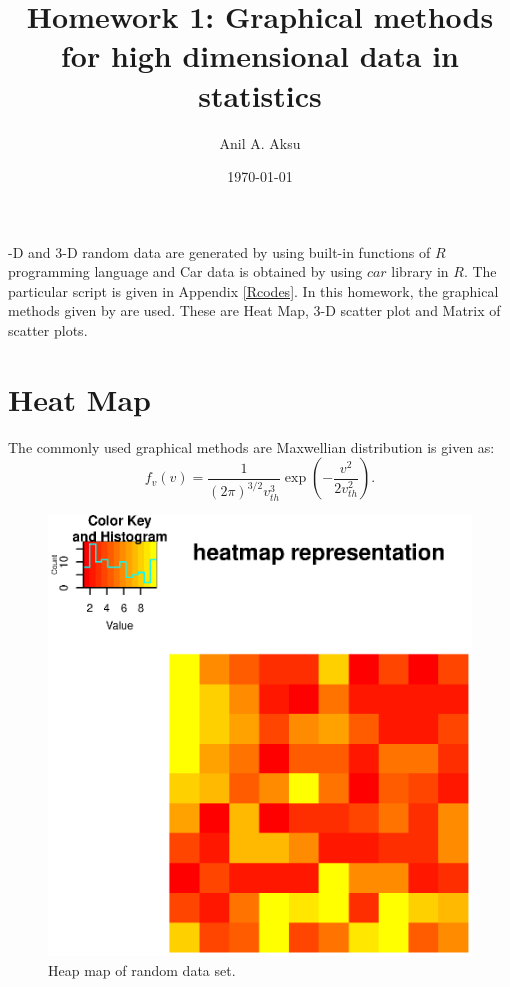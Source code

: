 \documentclass[11pt]{amsart}
\title{Homework 1: Graphical methods for high dimensional data in statistics }
\author{Anil A. Aksu }
\date{\today}
\begin{document}
-D and 3-D random data are generated by using built-in functions of $R$ programming language and Car data is obtained by using $car$ library in $R$. The particular script is given in Appendix \ref{Rcodes}. In this homework, the graphical methods given by \cite{Grinstein2001} are used. These are Heat Map, 3-D scatter plot and Matrix of scatter plots. 
\section*{\bf{Heat Map}}

The commonly used graphical methods  are 
Maxwellian distribution is given as: 
\begin{equation*}
f_v(v)=\frac{1}{(2 \pi)^{3/2}v_{th}^3}\exp(-\frac{v^2}{2 v_{th}^2}).
\end{equation*}

\begin{figure}[H]
\centering
 \includegraphics[scale=0.5]{Heatmap}%
  \caption{Heap map of random data set. }
\label{fig:Heatmap}
\end{figure} 
\end{document}
